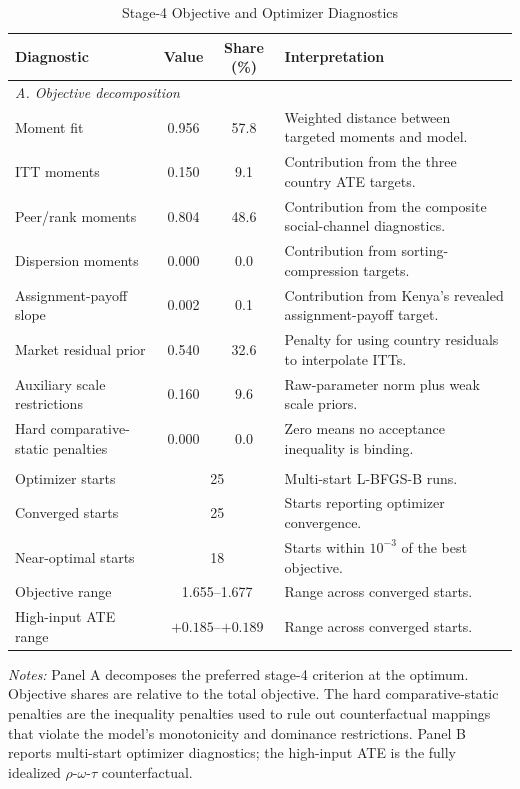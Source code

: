 \begin{table}[H]
\centering
\caption{Stage-4 Objective and Optimizer Diagnostics}
\label{tab:struct_stage4_discipline}
\begin{threeparttable}
\scriptsize
\setlength{\tabcolsep}{3pt}
\begin{tabular}[t]{lcc>{\raggedright\arraybackslash}p{5.7cm}}
\toprule
Diagnostic & Value & Share (\%) & Interpretation \\
\midrule
\multicolumn{4}{l}{\textit{A. Objective decomposition}} \\
Moment fit & 0.956 & 57.8 & Weighted distance between targeted moments and model. \\
ITT moments & 0.150 & 9.1 & Contribution from the three country ATE targets. \\
Peer/rank moments & 0.804 & 48.6 & Contribution from the composite social-channel diagnostics. \\
Dispersion moments & 0.000 & 0.0 & Contribution from sorting-compression targets. \\
Assignment-payoff slope & 0.002 & 0.1 & Contribution from Kenya's revealed assignment-payoff target. \\
Market residual prior & 0.540 & 32.6 & Penalty for using country residuals to interpolate ITTs. \\
Auxiliary scale restrictions & 0.160 & 9.6 & Raw-parameter norm plus weak scale priors. \\
Hard comparative-static penalties & 0.000 & 0.0 & Zero means no acceptance inequality is binding. \\
\addlinespace
\multicolumn{4}{l}{\textit{B. Numerical optimizer checks}} \\
Optimizer starts & \multicolumn{2}{c}{25} & Multi-start L-BFGS-B runs. \\
Converged starts & \multicolumn{2}{c}{25} & Starts reporting optimizer convergence. \\
Near-optimal starts & \multicolumn{2}{c}{18} & Starts within $10^{-3}$ of the best objective. \\
Objective range & \multicolumn{2}{c}{1.655--1.677} & Range across converged starts. \\
High-input ATE range & \multicolumn{2}{c}{$+0.185$--$+0.189$} & Range across converged starts. \\
\bottomrule
\end{tabular}
\begin{tablenotes}
\footnotesize
\item \textit{Notes:} Panel A decomposes the preferred stage-4 criterion at the optimum. Objective shares are relative to the total objective. The hard comparative-static penalties are the inequality penalties used to rule out counterfactual mappings that violate the model's monotonicity and dominance restrictions. Panel B reports multi-start optimizer diagnostics; the high-input ATE is the fully idealized $\rho$-$\omega$-$\tau$ counterfactual.
\end{tablenotes}
\end{threeparttable}
\end{table}
